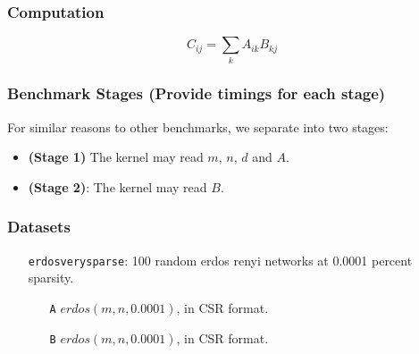 \documentclass{article}
\begin{document}
\subsubsection{Computation}

$$C_{ij} = \sum_{k}A_{ik}B_{kj}$$

\subsubsection{Benchmark Stages (Provide timings for each stage)}

For similar reasons to other benchmarks, we separate into two stages:

\begin{itemize}
\item \textbf{(Stage 1)}
	The kernel may read $m$, $n$, $d$ and $A$.
\item \textbf{(Stage 2)}:
	The kernel may read $B$.
\end{itemize}

\subsubsection{Datasets}

\begin{itemize}
	\item[\texttt{erdosverysparse}:] 100 random erdos renyi networks at 0.0001 percent sparsity.
	\begin{itemize}
		\item[\texttt{A}] $erdos(m, n, 0.0001)$, in CSR format.

        \item[\texttt{B}] $erdos(m, n, 0.0001)$, in CSR format.
	\end{itemize}
\end{itemize}



\end{document}
